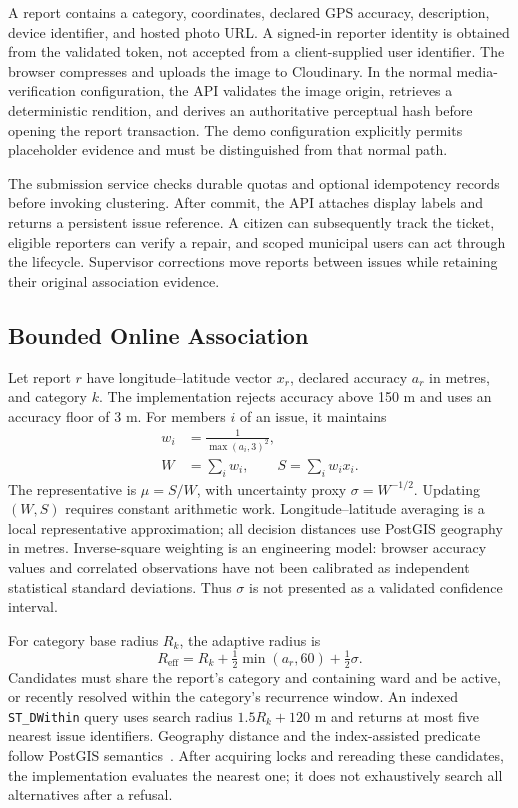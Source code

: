 \documentclass[conference,a4paper]{IEEEtran}
\begin{document}
A report contains a category, coordinates, declared GPS accuracy, description, device identifier, and hosted photo URL. A signed-in reporter identity is obtained from the validated token, not accepted from a client-supplied user identifier. The browser compresses and uploads the image to Cloudinary. In the normal media-verification configuration, the API validates the image origin, retrieves a deterministic rendition, and derives an authoritative perceptual hash before opening the report transaction. The demo configuration explicitly permits placeholder evidence and must be distinguished from that normal path.

The submission service checks durable quotas and optional idempotency records before invoking clustering. After commit, the API attaches display labels and returns a persistent issue reference. A citizen can subsequently track the ticket, eligible reporters can verify a repair, and scoped municipal users can act through the lifecycle. Supervisor corrections move reports between issues while retaining their original association evidence.

\subsection{Bounded Online Association}
Let report $r$ have longitude--latitude vector $x_r$, declared accuracy $a_r$ in metres, and category $k$. The implementation rejects accuracy above 150 m and uses an accuracy floor of 3 m. For members $i$ of an issue, it maintains
\begin{equation}
 \begin{aligned}
 w_i&=\frac{1}{\max(a_i,3)^2},\\
 W&=\sum_i w_i,\qquad S=\sum_i w_i x_i.
 \end{aligned}
 \label{eq:weights}
\end{equation}
The representative is $\mu=S/W$, with uncertainty proxy $\sigma=W^{-1/2}$. Updating $(W,S)$ requires constant arithmetic work. Longitude--latitude averaging is a local representative approximation; all decision distances use PostGIS geography in metres. Inverse-square weighting is an engineering model: browser accuracy values and correlated observations have not been calibrated as independent statistical standard deviations. Thus $\sigma$ is not presented as a validated confidence interval.

For category base radius $R_k$, the adaptive radius is
\begin{equation}
 R_{\mathrm{eff}}=R_k+\tfrac{1}{2}\min(a_r,60)+\tfrac{1}{2}\sigma.
 \label{eq:radius}
\end{equation}
Candidates must share the report's category and containing ward and be active, or recently resolved within the category's recurrence window. An indexed \texttt{ST\_DWithin} query uses search radius $1.5R_k+120$ m and returns at most five nearest issue identifiers. Geography distance and the index-assisted predicate follow PostGIS semantics~\cite{postgis}. After acquiring locks and rereading these candidates, the implementation evaluates the nearest one; it does not exhaustively search all alternatives after a refusal.
\end{document}
